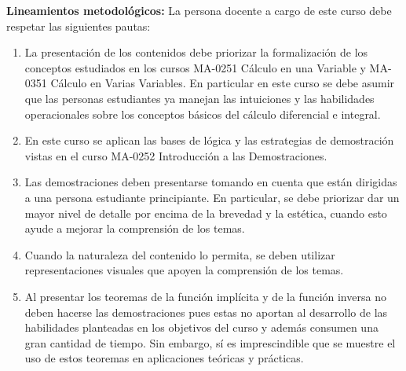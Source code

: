 \begin{refsection}
\noindent \textbf{Lineamientos metodológicos:} La persona docente a cargo de este curso debe respetar las siguientes pautas:
\begin{enumerate}
    \item La presentación de los contenidos debe priorizar la formalización de los conceptos estudiados en los cursos MA-0251 Cálculo en una Variable y MA-0351 Cálculo en Varias Variables. En particular en este curso se debe asumir que las personas estudiantes  ya manejan las intuiciones y las habilidades operacionales sobre los conceptos básicos del cálculo diferencial e integral.
    \item En este curso se aplican las bases de lógica y las estrategias de demostración vistas en el curso MA-0252 Introducción a las Demostraciones.
    \item Las demostraciones deben presentarse tomando en cuenta que están dirigidas a una persona estudiante principiante. En particular, se debe priorizar dar un mayor nivel de detalle por encima de la brevedad y la estética, cuando esto ayude a mejorar la comprensión de los temas.
    \item Cuando la naturaleza del contenido lo permita, se deben utilizar representaciones visuales que apoyen la comprensión de los temas.
    \item Al presentar los teoremas de la función implícita y de la función inversa no deben hacerse las demostraciones pues estas no aportan al desarrollo de las habilidades planteadas en los objetivos del curso y además consumen una gran cantidad de tiempo. Sin embargo, sí es imprescindible que se muestre el uso de estos teoremas en aplicaciones teóricas y prácticas.
\end{enumerate}


\end{refsection}
